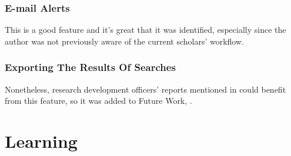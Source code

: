 \subsubsection{E-mail Alerts}
This is a good feature and it's great that it was identified, especially since the author was not previously aware of the current scholars' workflow.

\label{future-research-officers-reports}

\subsubsection{Exporting The Results Of Searches}
Nonetheless, research development officers' reports mentioned in  could benefit from this feature, so it was added to Future Work, .



\section{Learning}
